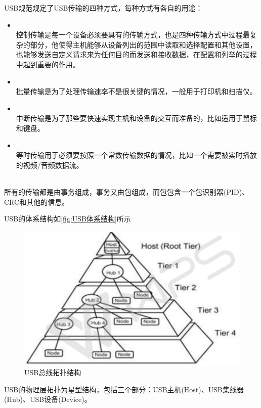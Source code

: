 USB规范规定了USB传输的四种方式，每种方式有各自的用途\cite{USB总线接口开发指南}：
\begin{itemize}
\item {}\\
	控制传输是每一个设备必须要具有的传输方式，也是四种传输方式中过程最复杂的部分，他使得主机能够从设备列出的范围中读取和选择配置和其他设置，也能够发送自定义请求来为任何目的而发送和接收数据，在配置和列举的过程中起到重要的作用。
\item {}\\
	批量传输是为了处理传输速率不是很关键的情况，一般用于打印机和扫描仪。
\item {}\\
	中断传输是为了那些要快速实现主机和设备的交互而准备的，比如适用于鼠标和键盘。
\item {}\\
	等时传输用于必须要按照一个常数传输数据的情况，比如一个需要被实时播放的视频/音频数据流。
\end{itemize}\\
所有的传输都是由事务组成，事务又由包组成，而包包含一个包识别器(PID)、CRC和其他的信息\cite{USB大全}。

	USB的体系结构如\autoref{fig:USB体系结构}所示
\begin{figure}[!h]
\centering
\includegraphics[width=1.0\textwidth]{./graphics/usb-structure.pdf}
\caption{USB总线拓扑结构}\label{fig:USB体系结构}
\end{figure}

	USB的物理层拓扑为星型结构，包括三个部分：USB主机(Host)、USB集线器(Hub)、USB设备(Device)。
	
